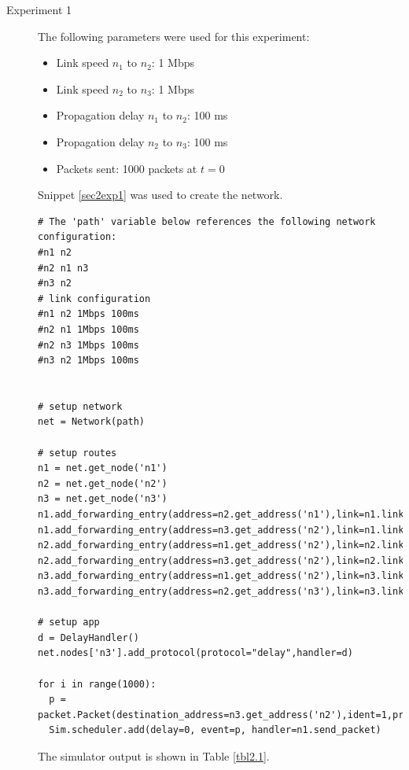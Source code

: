 \documentclass[11pt]{article}
\begin{document}
\begin{description}
\item[Experiment 1] \hfill \break
The following parameters were used for this experiment:

\begin{itemize}
\item Link speed $n_1$ to $n_2$: 1 Mbps
\item Link speed $n_2$ to $n_3$: 1 Mbps
\item Propagation delay $n_1$ to $n_2$: 100 ms
\item Propagation delay $n_2$ to $n_3$: 100 ms
\item Packets sent: 1000 packets at $t = 0$
\end{itemize}

\medskip

Snippet \ref{sec2exp1} was used to create the network.

\medskip

\begin{lstlisting}[caption={Network 2.1},label=sec2exp1]
# The 'path' variable below references the following network configuration:
#n1 n2
#n2 n1 n3
#n3 n2
# link configuration
#n1 n2 1Mbps 100ms
#n2 n1 1Mbps 100ms
#n2 n3 1Mbps 100ms
#n3 n2 1Mbps 100ms


# setup network
net = Network(path)

# setup routes
n1 = net.get_node('n1')
n2 = net.get_node('n2')
n3 = net.get_node('n3')
n1.add_forwarding_entry(address=n2.get_address('n1'),link=n1.links[0])
n1.add_forwarding_entry(address=n3.get_address('n2'),link=n1.links[0])
n2.add_forwarding_entry(address=n1.get_address('n2'),link=n2.links[0])
n2.add_forwarding_entry(address=n3.get_address('n2'),link=n2.links[1])
n3.add_forwarding_entry(address=n1.get_address('n2'),link=n3.links[0])
n3.add_forwarding_entry(address=n2.get_address('n3'),link=n3.links[0])

# setup app
d = DelayHandler()
net.nodes['n3'].add_protocol(protocol="delay",handler=d)

for i in range(1000):
  p = packet.Packet(destination_address=n3.get_address('n2'),ident=1,protocol='delay',length=1000)
  Sim.scheduler.add(delay=0, event=p, handler=n1.send_packet)
\end{lstlisting}

The simulator output is shown in Table \ref{tbl2.1}.

\smallskip


\end{description}
\end{document}
